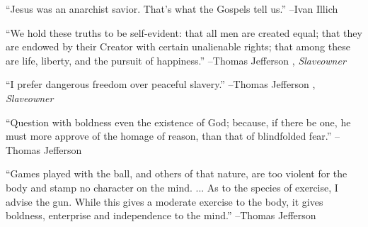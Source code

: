\documentclass{article}%
\begin{document}
\linebreak%
\vspace{1mm}%
\begin{minipage}{\textwidth}%
\flushleft%
“Jesus was an anarchist savior. That's what the Gospels tell us.”%
\linebreak%
\vspace{1mm}%
–Ivan Illich%
\linebreak%
\vspace{1mm}%
\end{minipage}%
\linebreak%
\vspace{1mm}%
\begin{minipage}{\textwidth}%
\flushleft%
“We hold these truths to be self{-}evident: that all men are created equal; that they are endowed by their Creator with certain unalienable rights; that among these are life, liberty, and the pursuit of happiness.”%
\linebreak%
\vspace{1mm}%
–Thomas Jefferson%
, \textit{Slaveowner}%
\linebreak%
\vspace{1mm}%
\end{minipage}%
\linebreak%
\vspace{1mm}%
\begin{minipage}{\textwidth}%
\flushleft%
“I prefer dangerous freedom over peaceful slavery.”%
\linebreak%
\vspace{1mm}%
–Thomas Jefferson%
, \textit{Slaveowner}%
\linebreak%
\vspace{1mm}%
\end{minipage}%
\linebreak%
\vspace{1mm}%
\begin{minipage}{\textwidth}%
\flushleft%
“Question with boldness even the existence of God; because, if there be one, he must more approve of the homage of reason, than that of blindfolded fear.”%
\linebreak%
\vspace{1mm}%
–Thomas Jefferson%
\linebreak%
\vspace{1mm}%
\end{minipage}%
\linebreak%
\vspace{1mm}%
\begin{minipage}{\textwidth}%
\flushleft%
“Games played with the ball, and others of that nature, are too violent for the body and stamp no character on the mind. ... As to the species of exercise, I advise the gun. While this gives a moderate exercise to the body, it gives boldness, enterprise and independence to the mind.”%
\linebreak%
\vspace{1mm}%
–Thomas Jefferson%
\linebreak%
\vspace{1mm}%
\end{minipage}%
\end{document}
